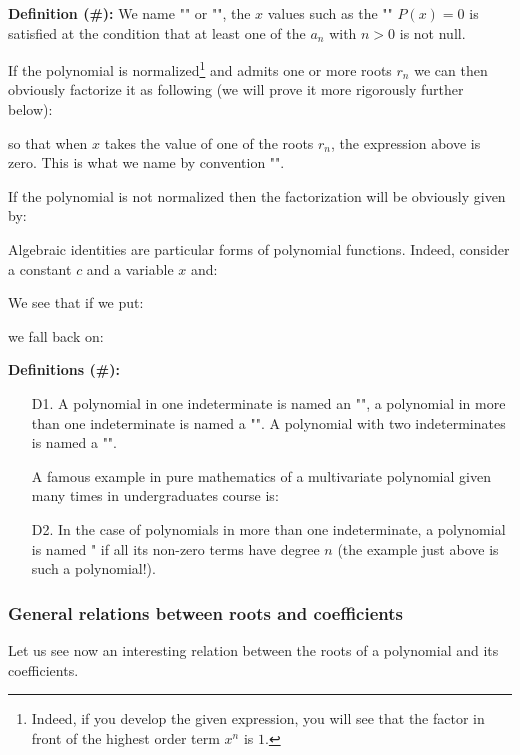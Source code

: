 	\textbf{Definition (\#\mydef):} We name "" or "", the $x$ values such as the "" $P(x)=0$ is satisfied at the condition that at least one of the $a_n$ with $n>0$ is not null.
	
	If the polynomial is normalized\footnote{Indeed, if you develop the given expression, you will see that the factor in front of the highest order term $x^n$ is $1$.} and admits one or more roots $r_n$ we can then obviously factorize it as following (we will prove it more rigorously further below):
	
	so that when $x$ takes the value of one of the roots $r_n$, the expression above is zero. This is what we name by convention "".
	
	If the polynomial is not normalized then the factorization will be obviously given by:
	
	
	Algebraic identities are particular forms of polynomial functions. Indeed, consider a constant $c$ and a variable $x$ and:
	
	We see that if we put:
	
	we fall back on:
	
	\textbf{Definitions (\#\mydef):}
	\begin{enumerate}
		\item[D1.] A polynomial in one indeterminate is named an "", a polynomial in more than one indeterminate is named a "". A polynomial with two indeterminates is named a "".
		
		A famous example in pure mathematics of a multivariate polynomial given many times in undergraduates course is: 
		
	
		\item[D2.] In the case of polynomials in more than one indeterminate, a polynomial is named  " if all its non-zero terms have degree $n$ (the example just above is such a polynomial!).
	\end{enumerate}
	
	\pagebreak
	\subsubsection{General relations between roots and coefficients}
	Let us see now an interesting relation between the roots of a polynomial and its coefficients.

